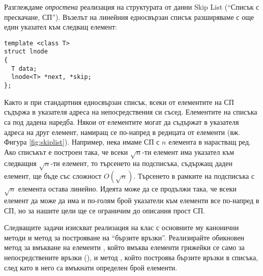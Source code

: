 \begin{mdframed}[hidealllines=true,backgroundcolor=gray!20]
Разглеждаме \emph{опростена} реализация на структурата от данни Skip List (``Списък с прескачане, СП''). Възелът на линейния едносвързан списък разширяваме с още един указател към следващ елемент:

\begin{verbatim}
template <class T>
struct lnode
{
  T data;
  lnode<T> *next, *skip;
};
\end{verbatim}
Както и при стандартния едносвързан списък, всеки от елементите на СП съдържа в указателя  адреса на непосредствения си съсед. Елементите на списъка са под дадена наредба. Някои от елементите могат да съдържат в указателя  адреса на друг елемент, намиращ се по-напред в редицата от елементи (вж. Фигура \ref{fig:skiplist}). Например, нека имаме СП с $n$ елемента в нарастващ ред. Ако списъкът е построен така, че всеки $\sqrt{n}$-ти елемент има указател към следващия  $\sqrt{n}$-ти елемент, то търсенето на подсписъка, съдържащ даден елемент, ще бъде със сложност $O(\sqrt{n})$. Търсенето в рамките на подсписъка с $\sqrt{n}$ елемента остава линейно. Идеята може да се продължи така, че всеки елемент да може да има и по-голям брой указатели към елементи все по-напред в СП, но за нашите цели ще се ограничим до описания прост СП.

Следващите задачи изискват реализация на клас  с основните му канонични методи и метод за построяване на ``бързите връзки''. Реализирайте обикновен метод за вмъкване на елементи , който вмъква елементи грижейки се само за непосредствените връзки (), и метод , който построява бързите връзки в списъка, след като в него са вмъкнати определен брой елементи.
\end{mdframed}

